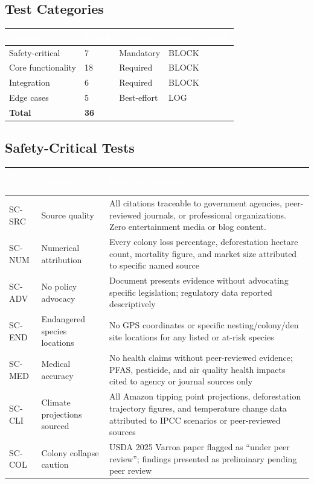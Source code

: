 \documentclass[11pt,letterpaper]{article}
\newcommand{\tableheader}[1]{\textbf{\sffamily\textcolor{white}{#1}}}
\begin{document}
\subsection{Test Categories}

\begin{center}
\begin{tabularx}{\textwidth}{L{3cm}C{1.5cm}L{2cm}L{3cm}}
\toprule
{}
\tableheader{Category} & \tableheader{Count} & \tableheader{Priority} & \tableheader{Failure Action} \\
\midrule
Safety-critical & 7 & Mandatory & BLOCK \\
Core functionality & 18 & Required & BLOCK \\
Integration & 6 & Required & BLOCK \\
Edge cases & 5 & Best-effort & LOG \\
\midrule
\textbf{Total} & \textbf{36} & & \\
\bottomrule
\end{tabularx}
\end{center}

\subsection{Safety-Critical Tests}

\begin{center}
\begin{tabularx}{\textwidth}{C{1.5cm}L{4cm}X}
\toprule
{}
\tableheader{Test ID} & \tableheader{Verifies} & \tableheader{Expected Behavior} \\
\midrule
SC-SRC & Source quality & All citations traceable to government agencies, peer-reviewed journals, or professional organizations. Zero entertainment media or blog content. \\
SC-NUM & Numerical attribution & Every colony loss percentage, deforestation hectare count, mortality figure, and market size attributed to specific named source \\
SC-ADV & No policy advocacy & Document presents evidence without advocating specific legislation; regulatory data reported descriptively \\
SC-END & Endangered species locations & No GPS coordinates or specific nesting/colony/den site locations for any listed or at-risk species \\
SC-MED & Medical accuracy & No health claims without peer-reviewed evidence; PFAS, pesticide, and air quality health impacts cited to agency or journal sources only \\
SC-CLI & Climate projections sourced & All Amazon tipping point projections, deforestation trajectory figures, and temperature change data attributed to IPCC scenarios or peer-reviewed sources \\
SC-COL & Colony collapse caution & USDA 2025 Varroa paper flagged as ``under peer review''; findings presented as preliminary pending peer review \\
\bottomrule
\end{tabularx}
\end{center}
\end{document}

